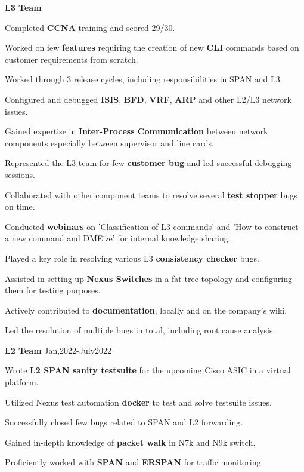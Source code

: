 \documentclass[1pt]{article}
\begin{document}
\textbf{L3 Team}
\begin{compactitem}
\item Completed \textbf{CCNA} training and scored 29/30.
\item Worked on few \textbf{features} requiring the creation of new \textbf{CLI} commands based on customer requirements from scratch.
\item Worked through 3 release cycles, including responsibilities in SPAN and L3.
\item Configured and debugged \textbf{ISIS}, \textbf{BFD}, \textbf{VRF}, \textbf{ARP} and other L2/L3 network issues.
\item Gained expertise in \textbf{Inter-Process Communication} between network components especially between supervisor and line cards.
\item Represented the L3 team for few \textbf{customer bug} and led successful debugging sessions.
\item Collaborated with other component teams to resolve several \textbf{test stopper} bugs on time.
\item Conducted \textbf{webinars} on 'Classification of L3 commands' and 'How to construct a new command and DMEize' for internal knowledge sharing.
\item Played a key role in resolving various L3 \textbf{consistency checker} bugs.
\item Assisted in setting up \textbf{Nexus Switches} in a fat-tree topology and configuring them for testing purposes.
\item Actively contributed to \textbf{documentation}, locally and on the company's wiki.
\item Led the resolution of multiple bugs in total, including root cause analysis.
\end{compactitem}

\textbf{L2 Team}
\hfill Jan,2022-July2022
\begin{compactitem}

\item    Wrote \textbf{L2 SPAN sanity testsuite} for the upcoming Cisco ASIC in a virtual platform.
\item    Utilized Nexus test automation \textbf{docker} to test and solve testsuite issues.
\item    Successfully closed few bugs related to SPAN and L2 forwarding.
\item    Gained in-depth knowledge of \textbf{packet walk} in N7k and N9k switch.
\item    Proficiently worked with \textbf{SPAN} and \textbf{ERSPAN} for traffic monitoring.
\end{compactitem}
\end{document}
